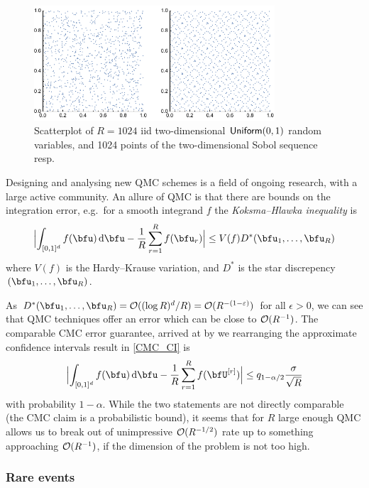 \begin{figure}[H]
\centering
\includegraphics[width=0.8\textwidth]{images/qmc.pdf}
\caption{Scatterplot of $R=1024$ iid two-dimensional $\mathsf{Uniform}(0,1)$ random variables, and 1024 points of the two-dimensional Sobol sequence resp.}
\label{fig:qmc}
\end{figure}

Designing and analysing new QMC schemes is a field of ongoing research, with a large active community. An allure of QMC is that there are bounds on the integration error, e.g.\ for a smooth integrand $f$ the \emph{Koksma--Hlawka inequality} \cite{asmussen2007stochastic,dick2010digital,glasserman2003monte} is
\[ \Bigl| \int_{[0,1]^d} f(\bfu) \dd \bfu - \frac1R \sum_{r=1}^R f(\bfu_r) \Bigr| \le V(f) D^\ast(\bfu_1,\dots,\bfu_R) \]
where $V(f)$ is the Hardy--Krause variation, and $D^\ast$ is the star discrepency $(\bfu_1,\dots, \bfu_R)$.

As $D^\ast(\bfu_1,\dots, \bfu_R) = \Oh( (\log R)^d / R ) = \Oh( R^{-(1-\epsilon)} )$ for all $\epsilon > 0$, we can see that QMC techniques offer an error which can be close to ${\mathcal{O}}(R^{-1})$. The comparable CMC error guarantee, arrived at by we rearranging the approximate confidence intervals result in \eqref{CMC_CI} is
\[ \Bigl| \int_{[0,1]^d} f(\bfu) \dd \bfu - \frac1R \sum_{r=1}^R f(\bfU^{[r]}) \Bigr| \le q_{1-\alpha/2} \frac{\sigma}{\sqrt{R}} \]
with probability $1-\alpha$. While the two statements are not directly comparable (the CMC claim is a probabilistic bound), it seems that for $R$ large enough QMC allows us to break out of unimpressive ${\mathcal{O}}(R^{-1/2})$ rate up to something approaching ${\mathcal{O}}(R^{-1})$, if the dimension of the problem is not too high.

\subsubsection{Rare events}

